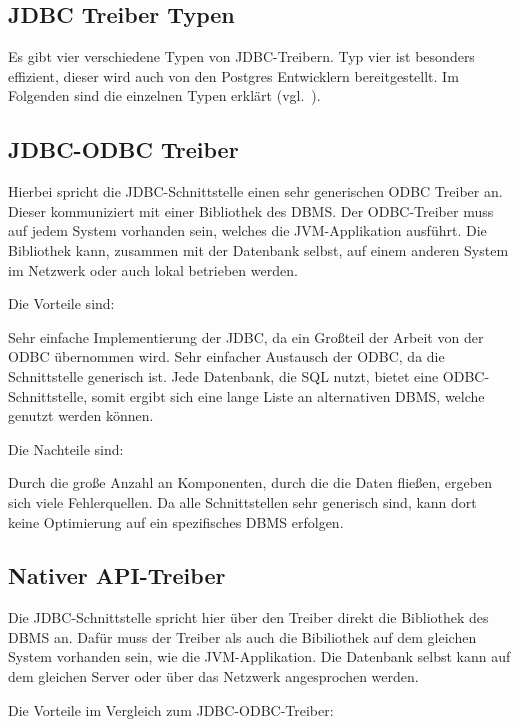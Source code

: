 {\subsection{JDBC Treiber Typen}
Es gibt vier verschiedene Typen von JDBC\hyp{}Treibern. Typ vier ist besonders
effizient, dieser wird auch von den Postgres Entwicklern bereitgestellt. Im
Folgenden sind die einzelnen Typen erklärt (vgl.~\cite{jdbc-types}).

\subsection{JDBC-ODBC Treiber}
Hierbei spricht die JDBC\hyp{}Schnittstelle einen sehr generischen \gls{ODBC}
Treiber an. Dieser kommuniziert mit einer Bibliothek des DBMS\@. Der
ODBC\hyp{}Treiber muss auf jedem System vorhanden sein, welches die
JVM\hyp{}Applikation ausführt. Die Bibliothek kann, zusammen mit der Datenbank
selbst, auf einem anderen System im Netzwerk oder auch lokal betrieben werden.

Die Vorteile sind:

\begin{outline}
  \1 Sehr einfache Implementierung der JDBC, da ein Großteil der Arbeit von
  der ODBC übernommen wird.
  \1 Sehr einfacher Austausch der ODBC, da die Schnittstelle generisch ist.
  \1 Jede Datenbank, die SQL nutzt, bietet eine ODBC\hyp{}Schnittstelle, somit
  ergibt sich eine lange Liste an alternativen DBMS, welche genutzt werden
  können.
\end{outline}

Die Nachteile sind:

\begin{outline}
  \1 Durch die große Anzahl an Komponenten, durch die die Daten fließen,
  ergeben sich viele Fehlerquellen.
  \1 Da alle Schnittstellen sehr generisch sind, kann dort keine Optimierung
  auf ein spezifisches DBMS erfolgen.
\end{outline}

\subsection{Nativer API-Treiber}
Die JDBC\hyp{}Schnittstelle spricht hier über den Treiber direkt die Bibliothek
des DBMS an. Dafür muss der Treiber als auch die Bibiliothek auf dem gleichen
System vorhanden sein, wie die JVM\hyp{}Applikation. Die Datenbank selbst kann auf
dem gleichen Server oder über das Netzwerk angesprochen werden.

Die Vorteile im Vergleich zum JDBC\hyp{}ODBC\hyp{}Treiber:

}
